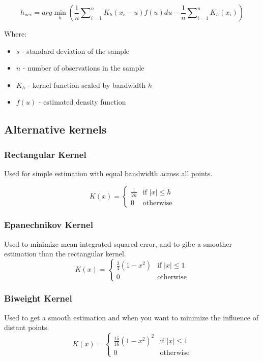 \documentclass[]{article}
\begin{document}
	$$ h_{ucv} = arg \min_h \left( \frac{1}{n} \sum\nolimits_{i=1}^{n} K_h (x_i - u) f(u) du - \frac{1}{n} \sum\nolimits_{i=1}^{n} K_h (x_i) \right) $$
	
	Where:
	\begin{itemize}
		\item [] \( s \) - standard deviation of the sample
		\item [] \( n \) - number of observations in the sample
		\item [] \( K_h \) - kernel function scaled by bandwidth \( h \)
		\item [] \( f(u) \) - estimated density function
	\end{itemize}
	
	\subsection{Alternative kernels}
	
	\subsubsection{Rectangular Kernel}
	Used for simple estimation with equal bandwidth across all points.
	
	$$K(x) = 
	\begin{cases} 
		\frac{1}{2h} & \text{if } |x| \leq h \\
		0 & \text{otherwise}
	\end{cases} $$
			
	\subsubsection{Epanechnikov Kernel}
	Used to minimize mean integrated squared error, and to gibe a smoother estimation than the rectangular kernel. 
	$$
	K(x) = 
	\begin{cases} 
		\frac{3}{4}(1 - x^2) & \text{if } |x| \leq 1 \\
		0 & \text{otherwise}
	\end{cases}
	$$
	
	\subsubsection{Biweight Kernel}
	Used to get a smooth estimation and when you want to minimize the influence of distant points.
	$$
	K(x) = 
	\begin{cases} 
		\frac{15}{16}(1 - x^2)^2 & \text{if } |x| \leq 1 \\
		0 & \text{otherwise}
	\end{cases}	
	$$
	
\end{document}

